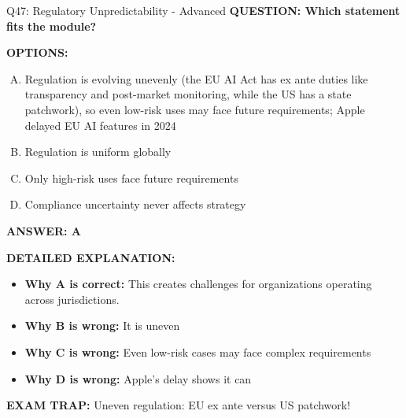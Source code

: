 \documentclass[8pt]{beamer}
\begin{document}
\begin{frame}[shrink=6]{Q47: Regulatory Unpredictability - Advanced}
\fontsize{6.5}{7.5}\selectfont
\textbf{QUESTION: Which statement fits the module?}

\vspace{0.1cm}
\textbf{OPTIONS:}
\begin{enumerate}[A.]
\item Regulation is evolving unevenly (the EU AI Act has ex ante duties like transparency and post-market monitoring, while the US has a state patchwork), so even low-risk uses may face future requirements; Apple delayed EU AI features in 2024
\item Regulation is uniform globally
\item Only high-risk uses face future requirements
\item Compliance uncertainty never affects strategy
\end{enumerate}

\vspace{0.1cm}
\textcolor{myblue}{\textbf{ANSWER: A}}

\vspace{0.1cm}
\textbf{DETAILED EXPLANATION:}
\begin{itemize}
\item \textbf{Why A is correct:} This creates challenges for organizations operating across jurisdictions.
\item \textbf{Why B is wrong:} It is uneven
\item \textbf{Why C is wrong:} Even low-risk cases may face complex requirements
\item \textbf{Why D is wrong:} Apple's delay shows it can
\end{itemize}

\textcolor{myred}{\textbf{EXAM TRAP:}} Uneven regulation: EU ex ante versus US patchwork!
\end{frame}
\end{document}

